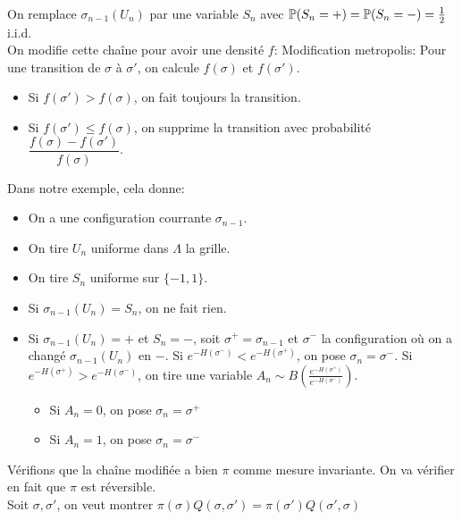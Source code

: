 \documentclass[]{report}
\begin{document}
    On remplace $\sigma_{n-1}(U_n)$ par une variable $S_n$ avec $\mathbb{P}(S_n=+)=\mathbb{P}(S_n=-)=\frac{1}{2}$ i.i.d.\\
    On modifie cette chaîne pour avoir une densité $f$: Modification metropolis: Pour une transition de $\sigma$ à $\sigma'$, on calcule $f(\sigma)$ et $f(\sigma')$.
    \begin{itemize}
        \item Si $f(\sigma')>f(\sigma)$, on fait toujours la transition.
        \item Si $f(\sigma')\le f(\sigma)$, on supprime la transition avec probabilité $\dfrac{f(\sigma)-f(\sigma')}{f(\sigma)}$.
    \end{itemize}
    Dans notre exemple, cela donne:
    \begin{itemize}
        \item On a une configuration courrante $\sigma_{n-1}$.
        \item On tire $U_n$ uniforme dans $\Lambda$ la grille.
        \item On tire $S_n$ uniforme sur $\{-1,1\}$.
        \item Si $\sigma_{n-1}(U_n)=S_n$, on ne fait rien.
        \item Si $\sigma_{n-1}(U_n)=+$ et $S_n=-$, soit $\sigma^+=\sigma_{n-1}$ et $\sigma^-$ la configuration où on a changé $\sigma_{n-1}(U_n)$ en $-$. Si $e^{-H(\sigma^-)}<e^{-H(\sigma^+)}$, on pose $\sigma_n=\sigma^-$. Si $e^{-H(\sigma^+)}>e^{-H(\sigma^-)}$, on tire une variable $A_n\sim B\left(\frac{e^{-H(\sigma^+)}}{e^{-H(\sigma^-)}}\right)$.
        \begin{itemize}
            \item Si $A_n=0$, on pose $\sigma_n=\sigma^+$
            \item Si $A_n=1$, on pose $\sigma_n=\sigma^-$
        \end{itemize}
    \end{itemize}
    Vérifions que la chaîne modifiée a bien $\pi$ comme mesure invariante. On va vérifier en fait que $\pi $ est réversible.\\
    Soit $\sigma,\sigma'$, on veut montrer $\pi(\sigma) Q(\sigma,\sigma')=\pi(\sigma')Q(\sigma',\sigma)$
\end{document}
